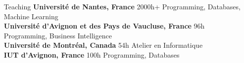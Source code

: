 \documentclass[11pt,a4paper]{article}
\begin{document}
\begin{itemize}
\begin{itemize}[
font=\normalfont\bfseries,
itemsep=.1cm,
wide=0cm,
labelsep*=.1cm]
\item[Journal Reviewing]~\\[.2em]
    Traitement Automatique des Langues, 
    Information Retrieval, 
    Natural Language Engineering, 
    Information Processing \& Management,
    Language Resources and Evaluation
    
\end{itemize}


\item[Teaching]
\textbf{Université de Nantes, France} \hfill 2000h+ \newline
Programming, Databases, Machine Learning \\[-.5cm]
                    
\textbf{Université d'Avignon et des Pays de Vaucluse, France} \hfill 96h \newline
Programming, Business Intelligence \\[-.5cm]
                    
\textbf{Université de Montréal, Canada} \hfill 54h \newline
Atelier en Informatique \\[-.5cm]
                
\textbf{IUT d'Avignon, France} \hfill 100h \newline
Programming, Databases \\[-.5cm]

\end{itemize}
\end{document}
